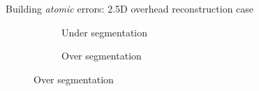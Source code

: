 \documentclass[export]{beamer}
\begin{document}
        \begin{frame}{Building \textit{atomic} errors: 2.5D overhead reconstruction case}
            \begin{figure}
                \begin{center}
                    \begin{subfigure}{.28\textwidth}
                        \caption{\label{fig::bul_under} Under segmentation}
                    \end{subfigure}
                    \hspace{10pt}
                    \begin{subfigure}{.28\textwidth}
                        \caption{\label{fig::bul_over} Over segmentation}

\end{subfigure}
\end{center}
\end{figure}
\end{frame}
\end{document}
